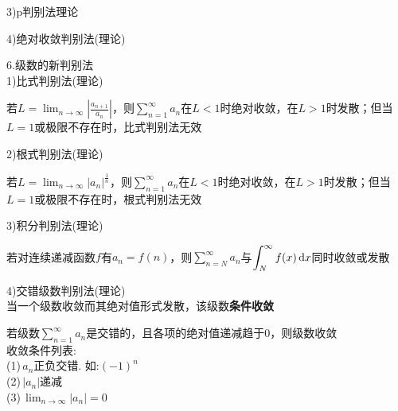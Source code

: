 3)p判别法{理论}
{\par\centering
{}
\par}\vspace{4ex}

4)绝对收敛判别法(理论)
{\par\centering
{}
\par}\vspace{6ex}

6.级数的新判别法\\
1)比式判别法(理论)
{\par\centering
\begin{boxedminipage}{\textwidth}
若$\displaystyle L=\lim_{n\to\infty}|\frac{a_{n+1}}{a_n}|$，则$\displaystyle\sum_{n=1}^{\infty}a_n$在$L<1$时绝对收敛，在$L>1$时发散；但当$L=1$或极限不存在时，比式判别法无效
\end{boxedminipage}
\par}\vspace{4ex}

2)根式判别法(理论)
{\par\centering
\begin{boxedminipage}{\textwidth}
若$\displaystyle L=\lim_{n\to\infty}|a_n|^{\frac{1}{n}}$，则$\displaystyle\sum_{n=1}^{\infty}a_n$在$L<1$时绝对收敛，在$L>1$时发散；但当$L=1$或极限不存在时，根式判别法无效
\end{boxedminipage}
\par}\vspace{4ex}

3)积分判别法(理论)
{\par\centering
\begin{boxedminipage}{\textwidth}
若对连续递减函数$f$有$a_n=f(n)$，则$\displaystyle\sum_{n=N}^{\infty}a_n$与$\displaystyle\int_N^{\infty}f(x)\mathop{}\!\mathrm{d} x$同时收敛或发散
\end{boxedminipage}
\par}\vspace{4ex}

4)交错级数判别法(理论)\\
当一个级数收敛而其绝对值形式发散，该级数\textbf{条件收敛}
{\par\centering
\begin{boxedminipage}{\textwidth}
若级数$\displaystyle\sum_{n=1}^{\infty}a_n$是交错的，且各项的绝对值递减趋于$0$，则级数收敛\\
收敛条件列表:\\
(1)\,$a_n$正负交错. 如:$(-1)^n$\\
(2)\,$|a_n|$递减\\
(3)\,$\displaystyle\lim_{n\to\infty}|a_n|=0$
\end{boxedminipage}
\par}

